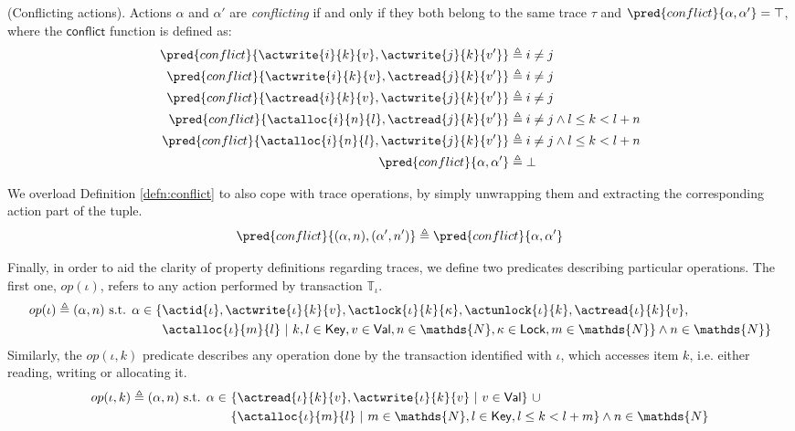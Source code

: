 \begin{defn}
	\label{defn:conflict}
	(Conflicting actions).
	Actions $\alpha$ and $\alpha'$ are \emph{conflicting} if and only if they both belong to the same trace $\tau$ and $\pred{conflict}{\alpha, \alpha'} = \top$, where the $\mathsf{conflict}$ function is defined as:
	\begin{align*}
		\pred{conflict}{\actwrite{i}{k}{v}, \actwrite{j}{k}{v'}} &\triangleq i \neq j
			\\
		\pred{conflict}{\actwrite{i}{k}{v}, \actread{j}{k}{v'}} &\triangleq i \neq j
			\\
		\pred{conflict}{\actread{i}{k}{v}, \actwrite{j}{k}{v'}} &\triangleq i \neq j
			\\
		\pred{conflict}{\actalloc{i}{n}{l}, \actread{j}{k}{v'}} &\triangleq i \neq j \land l \leq k < l + n
			\\
		\pred{conflict}{\actalloc{i}{n}{l}, \actwrite{j}{k}{v'}} &\triangleq i \neq j \land l \leq k < l + n
			\\
		\pred{conflict}{\alpha, \alpha'} &\triangleq \bot
	\end{align*}
\end{defn}
We overload Definition \ref{defn:conflict} to also cope with trace operations, by simply unwrapping them and extracting the corresponding action part of the tuple.
\[
	\pred{conflict}{(\alpha, n), (\alpha', n')} \triangleq \pred{conflict}{\alpha, \alpha'}
\]

Finally, in order to aid the clarity of property definitions regarding traces, we define two predicates describing particular operations. The first one, $op(\iota)$, refers to any action performed by transaction $\mathds{T}_\iota$.
\begin{align*}
	op(\iota) \triangleq (\alpha, n) \text{ s.t. } \alpha \in \{ &\actid{\iota}, \actwrite{\iota}{k}{v}, \actlock{\iota}{k}{\kappa}, \actunlock{\iota}{k}, \actread{\iota}{k}{v},
	\\
	&\actalloc{\iota}{m}{l}\ |\ k, l \in \mathsf{Key}, v \in \mathsf{Val}, n \in \mathds{N}, \kappa \in \mathsf{Lock}, m \in \mathds{N} \} \land n \in \mathds{N} \}
\end{align*}
Similarly, the $op(\iota, k)$ predicate describes any operation done by the transaction identified with $\iota$, which accesses item $k$, i.e. either reading, writing or allocating it.
\begin{align*}
	op(\iota, k) \triangleq (\alpha, n) \text{ s.t. } \alpha \in\ &\{ \actread{\iota}{k}{v}, \actwrite{\iota}{k}{v}\ |\ v \in \mathsf{Val} \}\
	\cup \\
	&\{\actalloc{\iota}{m}{l}\ |\ m \in \mathds{N}, l \in \mathsf{Key}, l \leq k < l + m \} \land n \in \mathds{N}
\end{align*}

